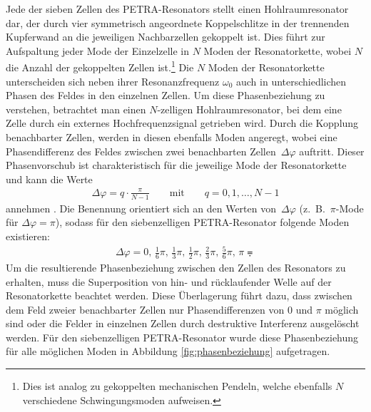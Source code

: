 Jede der sieben Zellen des PETRA-Resonators stellt einen Hohlraumresonator dar, der durch vier symmetrisch angeordnete Koppelschlitze in der trennenden Kupferwand an die jeweiligen Nachbarzellen gekoppelt ist.
Dies führt zur Aufspaltung jeder Mode der Einzelzelle in $N$ Moden der Resonatorkette, wobei $N$ die Anzahl der gekoppelten Zellen ist.\footnote{Dies ist analog zu gekoppelten mechanischen Pendeln, welche ebenfalls $N$ verschiedene Schwingungsmoden aufweisen.}
Die $N$ Moden der Resonatorkette unterscheiden sich neben ihrer Resonanzfrequenz $\omega_0$ auch in unterschiedlichen Phasen des Feldes in den einzelnen Zellen.
Um diese Phasenbeziehung zu verstehen, betrachtet man einen $N$-zelligen Hohlraumresonator, bei dem eine Zelle durch ein externes Hochfrequenzsignal getrieben wird.
Durch die Kopplung benachbarter Zellen, werden in diesen ebenfalls Moden angeregt, wobei eine Phasendifferenz des Feldes zwischen zwei benachbarten Zellen~$\Delta \varphi$ auftritt.
Dieser Phasenvorschub ist charakteristisch für die jeweilige Mode der Resonatorkette und kann die Werte
\begin{align}
	\Delta \varphi = q \cdot \frac{\pi}{N-1} \qquad \text{mit} \qquad q = 0, 1, \dots, N-1
\end{align}
annehmen \cite[S.\ 110]{wangler}. Die Benennung orientiert sich an den Werten von~$\Delta \varphi$ (z.\ B.\ $\pi$-Mode für $\Delta \varphi = \pi$), sodass für den siebenzelligen PETRA-Resonator folgende Moden existieren:
\begin{align}
  \Delta \varphi = 0,\, \frac{1}{6} \pi,\, \frac{1}{3} \pi,\, \frac{1}{2} \pi,\, \frac{2}{3} \pi,\, \frac{5}{6} \pi,\, \pi \eqdot
\end{align}
Um die resultierende Phasenbeziehung zwischen den Zellen des Resonators zu erhalten, muss die Superposition von hin- und rücklaufender Welle auf der Resonatorkette beachtet werden.
Diese Überlagerung führt dazu, dass zwischen dem Feld zweier benachbarter Zellen nur Phasendifferenzen von $0$ und $\pi$ möglich sind oder die Felder in einzelnen Zellen durch destruktive Interferenz ausgelöscht werden.
Für den siebenzelligen PETRA-Resonator wurde diese Phasenbeziehung für alle möglichen Moden in Abbildung \ref{fig:phasenbeziehung} aufgetragen.

